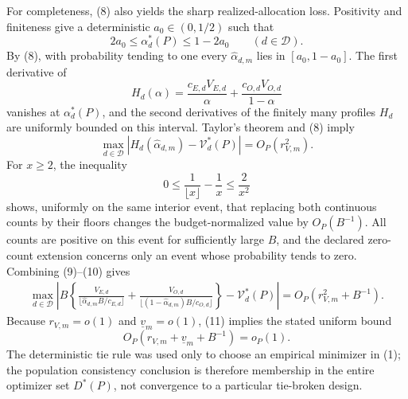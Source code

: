 For completeness, (8) also yields the sharp realized-allocation loss.  Positivity and finiteness give a deterministic \(a_0\in(0,1/2)\) such that
\[
 2a_0\le\alpha_d^*(P)\le1-2a_0
 \qquad(d\in\mathcal D).
\]
By (8), with probability tending to one every \(\widehat\alpha_{d,m}\) lies in \([a_0,1-a_0]\).  The first derivative of
\[
 H_d(\alpha)=
 \frac{c_{E,d}V_{E,d}}{\alpha}
 +\frac{c_{O,d}V_{O,d}}{1-\alpha}
\]
vanishes at \(\alpha_d^*(P)\), and the second derivatives of the finitely many profiles \(H_d\) are uniformly bounded on this interval.  Taylor's theorem and (8) imply
\[
 \max_{d\in\mathcal D}
 |H_d(\widehat\alpha_{d,m})-\mathcal V_d^*(P)|
 =O_P(r_{V,m}^2).
 \tag{9}
\]
For \(x\ge2\), the inequality
\[
 0\le\frac1{\lfloor x\rfloor}-\frac1x\le\frac2{x^2}
 \tag{10}
\]
shows, uniformly on the same interior event, that replacing both continuous counts by their floors changes the budget-normalized value by \(O_P(B^{-1})\).  All counts are positive on this event for sufficiently large \(B\), and the declared zero-count extension concerns only an event whose probability tends to zero.  Combining (9)--(10) gives
\[
\begin{aligned}
 \max_{d\in\mathcal D}\left|B\left\{
 \frac{V_{E,d}}{\lfloor\widehat\alpha_{d,m}B/c_{E,d}\rfloor}
 +\frac{V_{O,d}}{\lfloor(1-\widehat\alpha_{d,m})B/c_{O,d}\rfloor}
 \right\}-\mathcal V_d^*(P)\right|
 =O_P(r_{V,m}^2+B^{-1}).
\end{aligned}
 \tag{11}
\]
Because \(r_{V,m}=o(1)\) and \(\underline v_m=o(1)\), (11) implies the stated uniform bound
\[
 O_P(r_{V,m}+\underline v_m+B^{-1})=o_P(1).
\]
The deterministic tie rule was used only to choose an empirical minimizer in (1); the population consistency conclusion is therefore membership in the entire optimizer set \(D^*(P)\), not convergence to a particular tie-broken design.